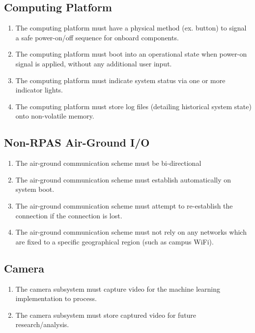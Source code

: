 \documentclass[10pt,letterpaper]{article}
\begin{document}
\subsection{Computing Platform}
\begin{enumerate}[label=F.CP.\arabic*, wide=1cm, widest=3cm, leftmargin=*, font=\bfseries, noitemsep,topsep=0pt, parsep=4pt, partopsep=0pt]
	\item The computing platform must have a physical method (ex. button) to signal a safe power-on/off sequence for onboard components.
	\item The computing platform must boot into an operational state when power-on signal is applied, without any additional user input.
	\item The computing platform must indicate system status via one or more indicator lights.
	\item The computing platform must store log files (detailing historical system state) onto non-volatile memory.
\end{enumerate}

\subsection{Non-RPAS Air-Ground I/O}
\begin{enumerate}[label=F.CM.\arabic*, wide=1cm, widest=3cm, leftmargin=*, font=\bfseries, noitemsep,topsep=0pt, parsep=4pt, partopsep=0pt]
	\item The air-ground communication scheme must be bi-directional
	\item The air-ground communication scheme must establish automatically on system boot.
	\item The air-ground communication scheme must attempt to re-establish the connection if the connection is lost.
	\item The air-ground communication scheme must not rely on any networks which are fixed to a specific geographical region (such as campus WiFi).

\end{enumerate}


\subsection{Camera}
\begin{enumerate}[label=F.CAM.\arabic*, wide=1cm, widest=3cm, leftmargin=*, font=\bfseries, noitemsep,topsep=0pt, parsep=4pt, partopsep=0pt]
	\item The camera subsystem must capture video for the machine learning implementation to process.
	\item The camera subsystem must store captured video for future research/analysis.
\end{enumerate}
\end{document}

